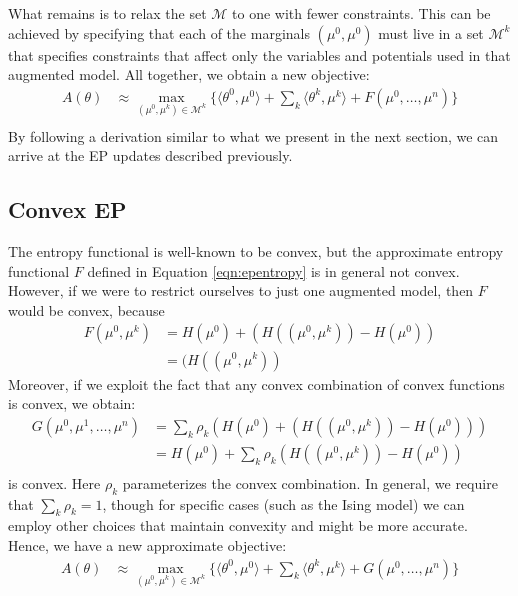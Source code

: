 \documentclass[times, 10pt,twocolumn]{article}
\begin{document}
What remains is to relax the set $\mathcal M$ to one with fewer
constraints. This can be achieved by specifying that each of the
marginals $(\mu^0,\mu^0)$ must live in a set $\mathcal M^k$ that
specifies constraints that affect only the variables and potentials
used in that augmented model. All together, we obtain a new
objective:
\begin{equation}
  \begin{split}
     A(\theta) 
     &\approx \max_{(\mu^0,\mu^k) \in \mathcal{M}^k} \{ \langle
     \theta^0, \mu^0 \rangle + \sum_k \langle\theta^k,\mu^k\rangle +F(\mu^0, \ldots, \mu^n) \} \\
   \end{split}
 \end{equation}
By following a derivation similar to what we present in the
next section, we can arrive at the EP updates described previously.

\subsection{Convex EP}

The entropy functional is well-known to be convex, but
the approximate entropy functional $F$ defined in Equation
\ref{eqn:epentropy} is in general not
convex\cite{wainwright08graphical}.
However, if we were to restrict ourselves to just one augmented
model, then $F$ would be convex, because
\begin{equation}
  \begin{split}
     F(\mu^0,\mu^k) &= H(\mu^0) + \left( H( (\mu^0, \mu^k)) -
     H(\mu^0) \right ) \\
     &= ( H( (\mu^0, \mu^k)) 
   \end{split}
 \end{equation}
Moreover, if we exploit the fact that any convex combination of
convex functions is convex, we obtain:
\begin{equation}
  \begin{split}
     G(\mu^0,\mu^1,\ldots,\mu^n) &= \sum_k \rho_k \left ( H(\mu^0) + \left( H( (\mu^0, \mu^k)) - H(\mu^0) \right ) \right ) \\
     &= H(\mu^0) + \sum_k \rho_k \left( H( (\mu^0, \mu^k)) - H(\mu^0) \right )  \\
   \end{split}
 \end{equation}
is convex. Here $\rho_k$ parameterizes the convex combination. In
general, we require that $\sum_k \rho_k = 1$, though for specific
cases (such as the Ising model) we can employ other choices that
maintain convexity and might be more accurate. Hence, we have a new
approximate objective:
\begin{equation}
  \begin{split}
     A(\theta) 
     &\approx \max_{(\mu^0,\mu^k) \in \mathcal{M}^k} \{
     \langle\theta^0,\mu^0\rangle + \sum_k \langle
     \theta^k,\mu^k\rangle  +G(\mu^0, \ldots, \mu^n) \} \\
   \end{split}
 \end{equation}
\end{document}
